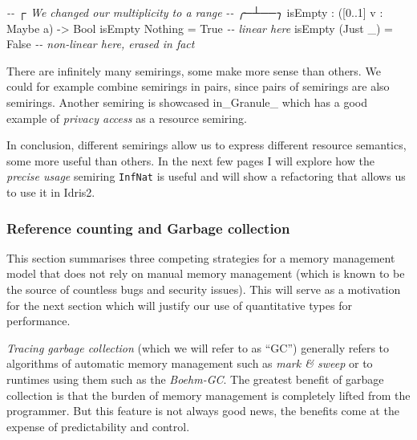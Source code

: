 \documentclass[
]{article}
\newenvironment{Shaded}{}{}
\newcommand{\CommentTok}[1]{\textcolor[rgb]{0.38,0.63,0.69}{\textit{#1}}}
\newcommand{\DataTypeTok}[1]{\textcolor[rgb]{0.56,0.13,0.00}{#1}}
\newcommand{\DecValTok}[1]{\textcolor[rgb]{0.25,0.63,0.44}{#1}}
\newcommand{\NormalTok}[1]{#1}
\newcommand{\OperatorTok}[1]{\textcolor[rgb]{0.40,0.40,0.40}{#1}}
\newcommand{\OtherTok}[1]{\textcolor[rgb]{0.00,0.44,0.13}{#1}}
\begin{document}
\begin{Shaded}
\begin{Highlighting}[]
\CommentTok{{-}{-}           ┌ We changed our multiplicity to a range}
\CommentTok{{-}{-}         ╭─┴──╮}
\NormalTok{isEmpty }\OperatorTok{:}\NormalTok{ ([}\DecValTok{0}\OperatorTok{..}\DecValTok{1}\NormalTok{] v }\OperatorTok{:} \DataTypeTok{Maybe}\NormalTok{ a) }\OtherTok{{-}\textgreater{}} \DataTypeTok{Bool}
\NormalTok{isEmpty }\DataTypeTok{Nothing} \OtherTok{=} \DataTypeTok{True} \CommentTok{{-}{-} linear here}
\NormalTok{isEmpty (}\DataTypeTok{Just}\NormalTok{ \_) }\OtherTok{=} \DataTypeTok{False} \CommentTok{{-}{-} non{-}linear here, erased in fact}
\end{Highlighting}
\end{Shaded}

There are infinitely many semirings, some make more sense than others.
We could for example combine semirings in pairs, since pairs of
semirings are also semirings. Another semiring is showcased
in\_Granule\_\cite{granule} which has a good example of \emph{privacy
access} as a resource semiring.

In conclusion, different semirings allow us to express different
resource semantics, some more useful than others. In the next few pages
I will explore how the \emph{precise usage} semiring \texttt{InfNat} is
useful and will show a refactoring that allows us to use it in Idris2.

\hypertarget{reference-counting-and-garbage-collection}{%
\subsubsection{Reference counting and Garbage
collection}\label{reference-counting-and-garbage-collection}}

This section summarises three competing strategies for a memory
management model that does not rely on manual memory management (which
is known to be the source of countless bugs and security issues). This
will serve as a motivation for the next section which will justify our
use of quantitative types for performance.

\emph{Tracing garbage collection} (which we will refer to as ``GC'')
generally refers to algorithms of automatic memory management such as
\emph{mark \& sweep} or to runtimes using them such as the
\emph{Boehm-GC}. The greatest benefit of garbage collection is that the
burden of memory management is completely lifted from the programmer.
But this feature is not always good news, the benefits come at the
expense of predictability and control.
\end{document}
